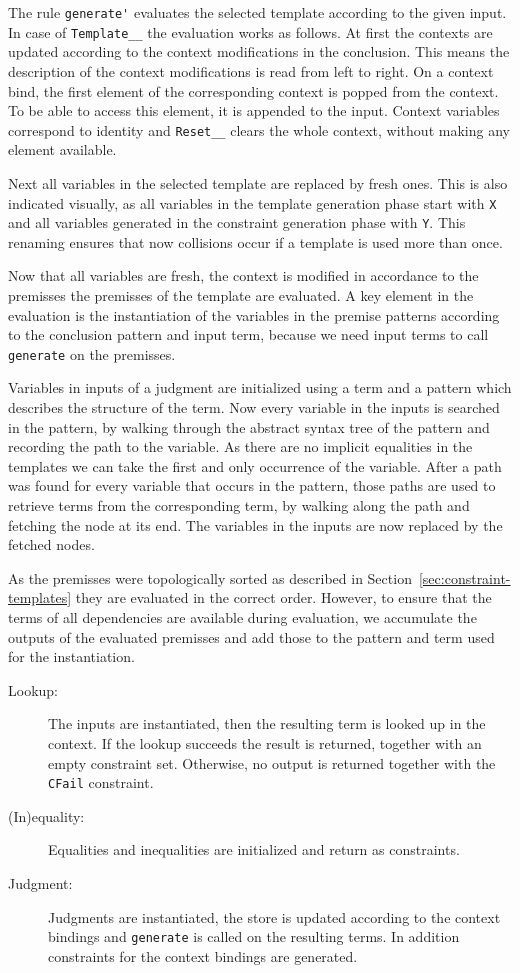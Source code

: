 The rule \verb|generate'| evaluates the selected template according to
the given input. In case of \verb|Template__| the evaluation works as
follows. At first the contexts are updated according to the context
modifications in the conclusion. This means the description of the
context modifications is read from left to right. On a context bind,
the first element of the corresponding context is popped from the
context. To be able to access this element, it is appended to the
input. Context variables correspond to identity and \verb|Reset__|
clears the whole context, without making any element available.

Next all variables in the selected template are replaced by fresh
ones. This is also indicated visually, as all variables in the
template generation phase start with \verb|X| and all variables
generated in the constraint generation phase with \verb|Y|. This
renaming ensures that now collisions occur if a template is used more
than once.

Now that all variables are fresh, the context is modified in
accordance to the premisses the premisses of the template are
evaluated. A key element in the evaluation is the instantiation of the
variables in the premise patterns according to the conclusion pattern
and input term, because we need input terms to call \verb|generate| on
the premisses.

Variables in inputs of a judgment are initialized using a term and a
pattern which describes the structure of the term. Now every variable
in the inputs is searched in the pattern, by walking through the
abstract syntax tree of the pattern and recording the path to the
variable. As there are no implicit equalities in the templates we can
take the first and only occurrence of the variable. After a path was
found for every variable that occurs in the pattern, those paths are
used to retrieve terms from the corresponding term, by walking along
the path and fetching the node at its end. The variables in the inputs
are now replaced by the fetched nodes.

As the premisses were topologically sorted as described in
Section~\ref{sec:constraint-templates} they are evaluated in the
correct order. However, to ensure that the terms of all dependencies
are available during evaluation, we accumulate the outputs of the
evaluated premisses and add those to the pattern and term used for the
instantiation.

\begin{description}
\item[Lookup:] The inputs are instantiated, then the resulting term is
  looked up in the context. If the lookup succeeds the result is
  returned, together with an empty constraint set. Otherwise, no
  output is returned together with the \verb|CFail| constraint.
\item[(In)equality:] Equalities and inequalities are initialized and
  return as constraints.
\item[Judgment:] Judgments are instantiated, the store is updated
  according to the context bindings and \verb|generate| is called on
  the resulting terms. In addition constraints for the context
  bindings are generated. 
\end{description}

